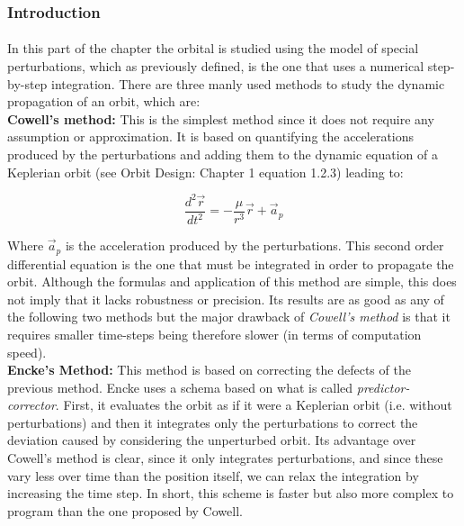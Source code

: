 \subsubsection{Introduction}
\paragraph{}In this part of the chapter the orbital is studied using the model of special perturbations, which as previously defined, is the one that uses a numerical step-by-step integration. There are three manly used methods to study the dynamic propagation of an orbit, which are:\\

\textbf{Cowell's method:} This is the simplest method since it does not require any assumption or approximation. It is based on quantifying the accelerations produced by the perturbations and adding them to the dynamic equation of a Keplerian orbit (see Orbit Design: Chapter 1 equation 1.2.3) leading to:

\begin{equation}\label{eq:ode}
\frac{d^2 \vec{r}}{d t^2}=-\frac{\mu}{r^3}\vec{r}+\vec{a}_p
\end{equation}

Where $\vec{a}_p$ is the acceleration produced by the perturbations. This second order differential equation is the one that must be integrated in order to propagate the orbit. Although the formulas and application of this method are simple, this does not imply that it lacks robustness or precision. Its results are as good as any of the following two methods but the major drawback of \textit{Cowell's method} is that it requires smaller time-steps being therefore slower (in terms of computation speed).\\

\textbf{Encke's Method:} This method is based on correcting the defects of the previous method. Encke uses a schema based on what is called \textit{predictor-corrector}. First, it evaluates the orbit as if it were a Keplerian orbit (i.e. without perturbations) and then it integrates only the perturbations to correct the deviation caused by considering the unperturbed orbit. Its advantage over Cowell's method is clear, since it only integrates perturbations, and since these vary less over time than the position itself, we can relax the integration by increasing the time step. In short, this scheme is faster but also more complex to program than the one proposed by Cowell.\\

